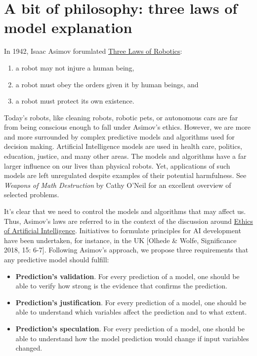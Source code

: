 \documentclass[]{krantz}
\providecommand{\tightlist}{%
  \setlength{\itemsep}{0pt}\setlength{\parskip}{0pt}}
\begin{document}
\hypertarget{three-single-laws}{%
\section{A bit of philosophy: three laws of model explanation}\label{three-single-laws}}

In 1942, Isaac Asimov forumlated \href{https://en.wikipedia.org/wiki/Three_Laws_of_Robotics}{Three Laws of Robotics}:

\begin{enumerate}
\def\labelenumi{\arabic{enumi})}
\tightlist
\item
  a robot may not injure a human being,
\item
  a robot must obey the orders given it by human beings, and
\item
  a robot must protect its own existence.
\end{enumerate}

Today's robots, like cleaning robots, robotic pets, or autonomous cars are far from being conscious enough to fall under Asimov's ethics. However, we are more and more surrounded by complex predictive models and algorithms used for decision making. Artificial Intelligence models are used in health care, politics, education, justice, and many other areas. The models and algorithms have a far larger influence on our lives than physical robots. Yet, applications of such models are left unregulated despite examples of their potential harmfulness. See \emph{Weapons of Math Destruction} by Cathy O'Neil \citep{ONeil} for an excellent overview of selected problems.

It's clear that we need to control the models and algorithms that may affect us. Thus, Asimov's laws are referred to in the context of the discussion around \href{https://en.wikipedia.org/wiki/Ethics_of_artificial_intelligence}{Ethics of Artificial Intelligence}. Initiatives to formulate principles for AI development have been undertaken, for instance, in the UK {[}Olhede \& Wolfe, Significance 2018, 15: 6-7{]}. Following Asimov's approach, we propose three requirements that any predictive model should fulfill:

\begin{itemize}
\tightlist
\item
  \textbf{Prediction's validation}. For every prediction of a model, one should be able to verify how strong is the evidence that confirms the prediction.
\item
  \textbf{Prediction's justification}. For every prediction of a model, one should be able to understand which variables affect the prediction and to what extent.
\item
  \textbf{Prediction's speculation}. For every prediction of a model, one should be able to understand how the model prediction would change if input variables changed.
\end{itemize}
\end{document}
